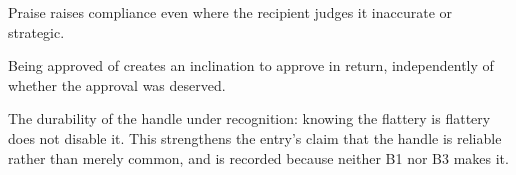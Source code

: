 

\begin{distilled}
  \item Praise raises compliance even where the recipient judges it inaccurate or strategic.
  \item Being approved of creates an inclination to approve in return, independently of whether the approval was deserved.
\end{distilled}

\begin{unique}
  \item The durability of the handle under recognition: knowing the flattery is flattery does not disable it. This strengthens the entry's claim that the handle is reliable rather than merely common, and is recorded because neither B1 nor B3 makes it.
\end{unique}
